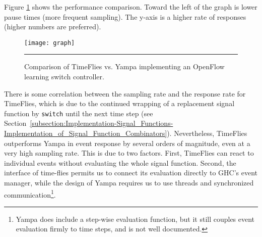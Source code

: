 Figure \ref{fig:timeflies-yampa-comparison} shows the performance comparison.
Toward the left of the graph is lower pause times (more frequent sampling). The
y-axis is a higher rate of responses (higher numbers are preferred). 

\begin{figure}
\texttt{[image: graph]}
\hrule
\caption{Comparison of TimeFlies vs. Yampa implementing an OpenFlow learning switch controller.}
\label{fig:timeflies-yampa-comparison}
\end{figure}

There is some correlation between the sampling rate and the response rate
for TimeFlies, which is due to the continued wrapping of a replacement signal
function by {\tt switch} until the next time step (see Section~\ref{subsection:Implementation-Signal_Functions-Implementation_of_Signal_Function_Combinators}).
Nevertheless, TimeFlies outperforms Yampa in event response by several orders of magnitude,
even at a very high sampling rate. This is due to two factors. First, TimeFlies can react
to individual events without evaluating the whole signal function. Second, the
interface of time-flies permits us to connect its evaluation directly to GHC's event
manager, while the design of Yampa requires us to use threads and synchronized
communication\footnote{Yampa does include a step-wise evaluation function, but
it still couples event evaluation firmly to time steps, and is not well
documented.}.

